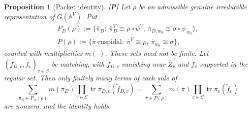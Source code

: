 \documentclass[12pt]{article}
\newcommand{\ov}[1]{\overline{#1}}
\newcommand{\A}{\mathbb{A}}
\newcommand{\tr}{\operatorname{tr}}
\newcommand{\Gb}{\ov{G}}
\newcommand{\Zb}{\ov{Z}}
\newcommand{\pib}{\ov{\pi}}
\newcommand{\Pv}{\textbf{[P]}}
\theoremstyle{plain}
\newtheorem{proposition}[theorem]{Proposition}
\theoremstyle{definition}
\begin{document}
\begin{proposition}[Packet identity]\label{prop:packet}\Pv
Let $\rho$ be an admissible genuine irreducible representation of $\Gb(\A^V)$. Put
\begin{gather*} P_D(\rho):=\{\pib_D:\ \pib_D^V\cong\rho\circ\psi^V,\ \pib_{D,w_0}\cong\sigma\circ\psi_{w_0}\},\\ P(\rho):=\{\pib\ \mathrm{cuspidal}:\ \pib^V\cong\rho,\ \pib_{w_0}\cong\sigma\}, \end{gather*}
counted with multiplicities $m(\cdot)$. These sets need not be finite. Let $(\tilde f_{D,v},\tilde f_v)_{v\in S}$ be matching, with $\tilde f_{D,v}$ vanishing near $\Zb_v$ and $\tilde f_v$ supported in the regular set. Then only finitely many terms of each side of
\begin{equation}\label{eq:packet}
\sum_{\pib_D\in P_D(\rho)}m(\pib_D)\prod_{v\in S}\tr\pib_{D,v}(\tilde f_{D,v})=\sum_{\pib\in P(\rho)}m(\pib)\prod_{v\in S}\tr\pib_v(\tilde f_v)
\end{equation}
are nonzero, and the identity holds.
\end{proposition}
\end{document}
